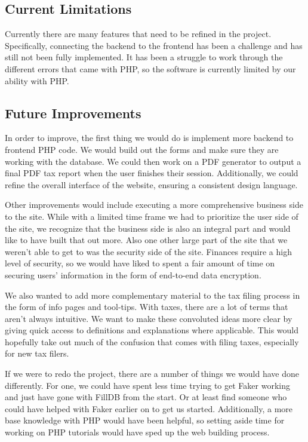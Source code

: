 \documentclass[sigconf]{acmart}
\begin{document}
\subsection{Current Limitations}
Currently there are many features that need to be refined in the project. Specifically, connecting the backend to the frontend has been a challenge and has still not been fully implemented. It has been a struggle to work through the different errors that came with PHP, so the software is currently limited by our ability with PHP.

\subsection{Future Improvements}
In order to improve, the first thing we would do is implement more backend to frontend PHP code. We would build out the forms and make sure they are working with the database. We could then work on a PDF generator to output a final PDF tax report when the user finishes their session. Additionally, we could refine the overall interface of the website, ensuring a consistent design language.

Other improvements would include executing a more comprehensive business side to the site. While with a limited time frame we had to prioritize the user side of the site, we recognize that the business side is also an integral part and would like to have built that out more. Also one other large part of the site that we weren't able to get to was the security side of the site. Finances require a high level of security, so we would have liked to spent a fair amount of time on securing users' information in the form of end-to-end data encryption.

We also wanted to add more complementary material to the tax filing process in the form of info pages and tool-tips. With taxes, there are a lot of terms that aren't always intuitive. We want to make these convoluted ideas more clear by giving quick access to definitions and explanations where applicable. This would hopefully take out much of the confusion that comes with filing taxes, especially for new tax filers.

If we were to redo the project, there are a number of things we would have done differently. For one, we could have spent less time trying to get Faker working and just have gone with FillDB from the start. Or at least find someone who could have helped with Faker earlier on to get us started. Additionally, a more base knowledge with PHP would have been helpful, so setting aside time for working on PHP tutorials would have sped up the web building process.
\end{document}

